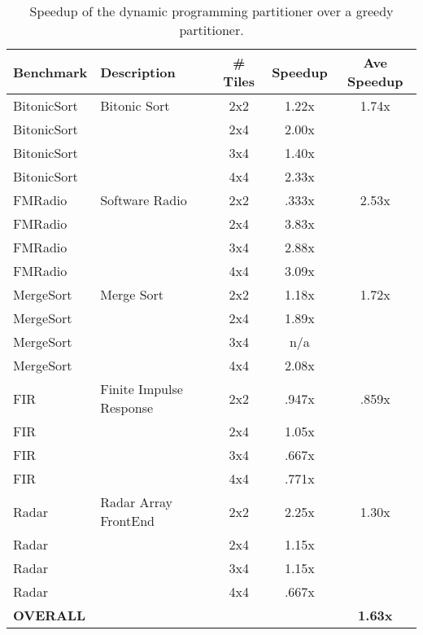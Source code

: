 \begin{table*}[t]
\vspace{-12pt}
\vspace{-4pt}
\begin{center}
\scriptsize
\begin{tabular}{|l|l||c||c||c||} \hline
{\bf Benchmark} & {\bf Description} & {\bf \# Tiles} & {\bf Speedup} & {\bf Ave Speedup}
\\\hline
BitonicSort & Bitonic Sort & 2x2 & 1.22x & 1.74x
\\\hline
BitonicSort & & 2x4 & 2.00x &
\\\hline
BitonicSort & & 3x4 & 1.40x&
\\\hline
BitonicSort & & 4x4 & 2.33x&
\\\hline
FMRadio & Software Radio & 2x2 & .333x & 2.53x
\\\hline
FMRadio & & 2x4 &3.83x&
\\\hline
FMRadio & & 3x4 & 2.88x&
\\\hline
FMRadio & & 4x4 & 3.09x&
\\\hline
MergeSort & Merge Sort & 2x2 & 1.18x & 1.72x
\\\hline
MergeSort & & 2x4 &1.89x&
\\\hline
MergeSort & & 3x4 & n/a&
\\\hline
MergeSort & & 4x4 & 2.08x&
\\\hline
FIR & Finite Impulse Response & 2x2 & .947x & .859x
\\\hline
FIR & & 2x4 &1.05x&
\\\hline
FIR & & 3x4 & .667x&
\\\hline
FIR & &4x4 & .771x&
\\\hline
Radar & Radar Array FrontEnd & 2x2 & 2.25x & 1.30x
\\\hline
Radar & & 2x4 & 1.15x&
\\\hline
Radar & & 3x4 & 1.15x&
\\\hline
Radar & & 4x4 & .667x&
\\\hline
{\bf OVERALL} & & & & {\bf 1.63x}
\\\hline
\end{tabular}
\vspace{-6pt}
\caption{Speedup of the dynamic programming partitioner over a greedy partitioner.}
\label{tab:benchmarks}
\vspace{-20pt}
\end{center}
\end{table*}

